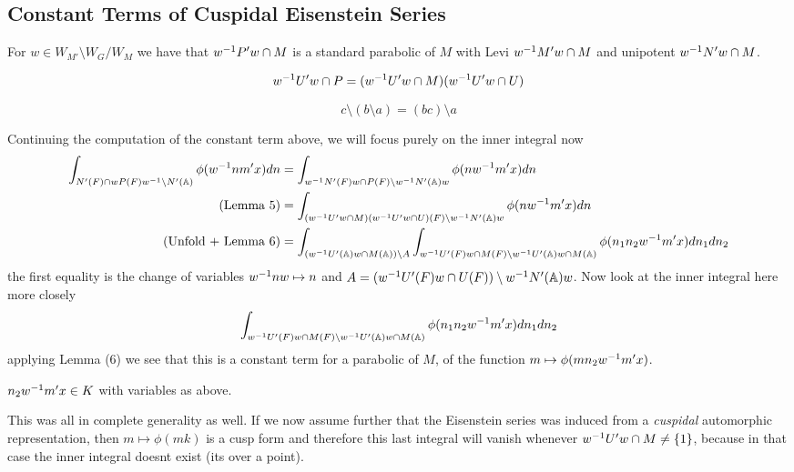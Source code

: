\subsection{Constant Terms of Cuspidal Eisenstein Series}
\begin{Lemma}[4]
        For \(w\in W_{M'}\setminus W_G / W_{M} \) we have that \(w^{-1} P'w\cap M\) is a standard parabolic of \(M\) with Levi \(w^{-1} M'w\cap M\) and unipotent \(w^{-1} N'w\cap M\).
    \end{Lemma}
    \begin{Lemma}[5]
        \[w^{-1} U' w \cap P = (w^{-1} U' w \cap M)(w^{-1} U' w \cap U)\]
    \end{Lemma}
    \begin{Lemma}[6]
        \[c\setminus (b\setminus a )= (bc)\setminus a\]
    \end{Lemma}

    Continuing the computation of the constant term above, we will focus purely on the inner integral now
    \begin{equation*}
        \begin{aligned}
            \int_{N'(F)\cap wP(F)w\inv \setminus N'(\A)} \phi( w\inv nm' x)  dn &= \int_{w\inv N'(F)w \cap P(F) \setminus w\inv N'(\A)w} \phi( nw\inv m' x)  dn \\
            (\text{Lemma 5})&= \int_{(w\inv U' w \cap M)(w\inv U' w \cap U)(F) \setminus w\inv N'(\A)w} \phi( nw\inv m' x)  dn \\
            (\text{Unfold + Lemma 6})  &= \int_{(w\inv U'(\A)w \cap M(\A)) \setminus A} \int_{w\inv U'(F) w \cap M(F) \setminus w\inv U'(\A)w \cap M(\A)} \phi( n_1 n_2 w\inv m' x)  dn_1 dn_2 \\
        \end{aligned}
    \end{equation*}
    the first equality is the change of variables \(w^{-1} n w\mapsto n \) and \(A = (w\inv U'(F) w \cap U(F) ) \setminus w\inv N'(\A)w \). Now look at the inner integral here more closely 
    \[ \int_{w\inv U'(F) w \cap M(F) \setminus w\inv U'(\A)w \cap M(\A)} \phi( n_1 n_2 w\inv m' x)  dn_1 dn_2\]
    applying Lemma (6) we see that this is a constant term for a parabolic of \(M\), of the function \(m\mapsto \phi(m n_2 w\inv m' x)\). 
    \begin{Lemma}
        \(n_2 w^{-1} m' x \in K\) with variables as above.
    \end{Lemma}
    This was all in complete generality as well. If we now assume further that the Eisenstein series was induced from a \textit{cuspidal} automorphic representation, then \(m\mapsto \phi(mk)\) is a cusp form and therefore this last integral will vanish whenever \(w^{-1} U'w \cap M \neq \{1\}\), because in that case the inner integral doesnt exist (its over a point).

